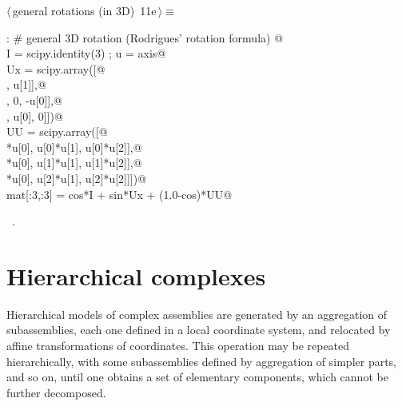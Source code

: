 \documentclass[11pt,oneside]{article}	%
\begin{document}
\begin{flushleft} \small \label{scrap25}
\protect{}$\langle\,$general rotations (in 3D)\nobreak\ {\footnotesize 11e}$\,\rangle\equiv$
\vspace{-1ex}
\begin{list}{}{} \item
\mbox{}\verb@else:    # general 3D rotation (Rodrigues' rotation formula)   @\\
\mbox{}\verb@   I = scipy.identity(3) ; u = axis@\\
\mbox{}\verb@   Ux = scipy.array([@\\
\mbox{}\verb@      [0,      -u[2],    u[1]],@\\
\mbox{}\verb@      [u[2],      0,    -u[0]],@\\
\mbox{}\verb@      [-u[1],   u[0],      0]])@\\
\mbox{}\verb@   UU = scipy.array([@\\
\mbox{}\verb@      [u[0]*u[0], u[0]*u[1],  u[0]*u[2]],@\\
\mbox{}\verb@      [u[1]*u[0], u[1]*u[1],  u[1]*u[2]],@\\
\mbox{}\verb@      [u[2]*u[0], u[2]*u[1],  u[2]*u[2]]])@\\
\mbox{}\verb@   mat[:3,:3] = cos*I + sin*Ux + (1.0-cos)*UU@\\
\mbox{}\verb@@{\NWsep}
\end{list}
\vspace{-1ex}
\footnotesize\addtolength{\baselineskip}{-1ex}
\begin{list}{}{\setlength{\itemsep}{-\parsep}\setlength{\itemindent}{-\leftmargin}}
\item \NWtxtMacroRefIn\ .
\end{list}
\end{flushleft}
\section{Hierarchical complexes}
Hierarchical models of complex assemblies are generated by an aggregation
of subassemblies, each one defined in a local coordinate system, and
relocated by affine transformations of coordinates.  This operation
may be repeated hierarchically, with some subassemblies defined by
aggregation of simpler parts, and so on, until one obtains a set of
elementary components, which cannot be further decomposed.
\end{document}
